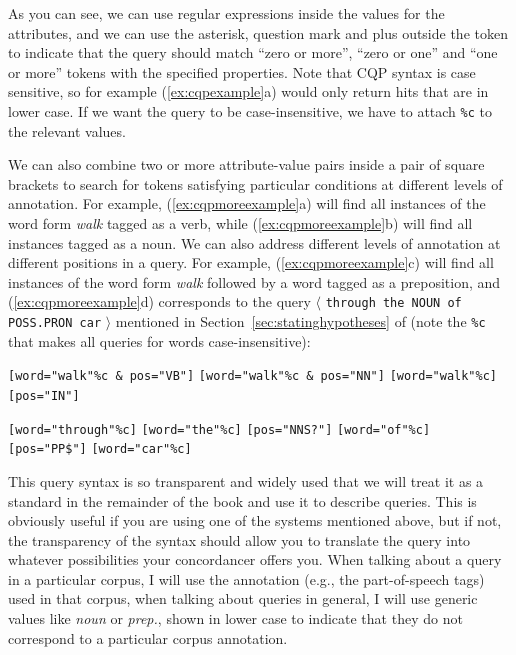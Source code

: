 As you can see, we can use regular expressions inside the values for the attributes, and we can use the asterisk, question mark and plus outside the token to indicate that the query  should match ``zero or more'', ``zero or one'' and ``one or more'' tokens with the specified properties. Note that CQP syntax is case sensitive, so for example (\ref{ex:cqpexample}a) would only return hits  that are in lower case. If we want the query to be case\hyp{}insensitive, we have to attach \texttt{\%c} to the relevant values.

We can also combine two or more attribute\hyp{}value pairs inside a pair of square brackets to search for tokens satisfying particular conditions at different levels of annotation.  For example, (\ref{ex:cqpmoreexample}a) will find all instances of the word form \textit{walk} tagged  as a verb,  while (\ref{ex:cqpmoreexample}b) will find all instances tagged as a noun.  We can also address different levels of annotation at different positions in a query.  For example, (\ref{ex:cqpmoreexample}c) will find all instances of the word form \textit{walk} followed by a word tagged  as a preposition,  and (\ref{ex:cqpmoreexample}d) corresponds to the query $\langle$ \texttt{through the NOUN of POSS.PRON car} $\rangle$ mentioned in Section~\ref{sec:statinghypotheses} of  (note the \texttt{\%c} that makes all queries  for words case\hyp{}insensitive):


\begin{exe}
\ex
\begin{xlist}
\label{ex:cqpmoreexample}
\ex \texttt{[word="walk"\%c \& pos="VB"]}
\ex \texttt{[word="walk"\%c \& pos="NN"]}
\ex \texttt{[word="walk"\%c]} \texttt{[pos="IN"]}
\ex \begin{minipage}[t]{0.85\textwidth} \raggedright \texttt{[word="through"\%c]} \texttt{[word="the"\%c]} \texttt{[pos="NNS?"]} \texttt{[word="of"\%c]} \texttt{[pos="PP\$"]} \texttt{[word="car"\%c]} \end{minipage}
\end{xlist}
\end{exe}

This query syntax is so transparent and widely used that we will treat it as a standard in the remainder of the book and use it to describe queries. This is obviously useful if you are using one of the systems mentioned above, but if not, the transparency of the syntax should allow you to translate the query  into whatever possibilities your concordancer  offers you. When talking about a query in a particular corpus, I will use the annotation  (e.g., the part\hyp{}of\hyp{}speech tags) used in that corpus, when talking about queries in general, I will use generic values like \textit{noun}  or \textit{prep.}, shown in lower case to indicate that they do not correspond to a particular corpus annotation.

